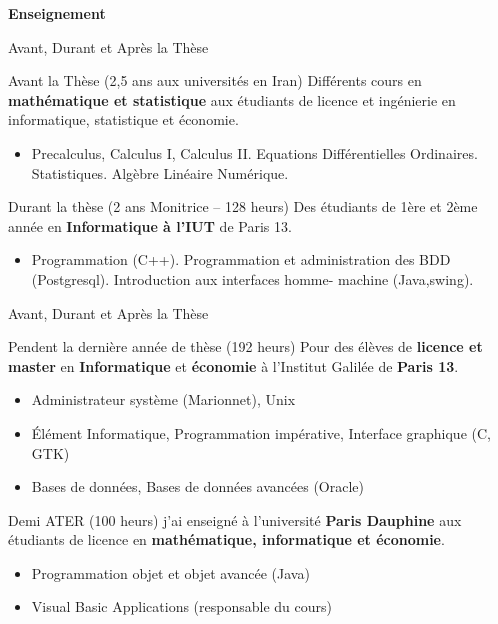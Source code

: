 \documentclass{beamer}
\begin{document}
{{%

\begin{frame}
	\begin{center}
	\textbf{Enseignement}
	\end{center}
\end{frame}
{

\begin{frame}{Avant, Durant et Après la Thèse}
\begin{block}{Avant la Thèse (2,5 ans aux universités en Iran)}
Différents cours en \textbf{mathématique et statistique} aux étudiants de licence et ingénierie en informatique, statistique et économie.
\begin{itemize}
\item Precalculus, Calculus I, Calculus II. Equations Différentielles Ordinaires. Statistiques. Algèbre Linéaire Numérique.
\end{itemize}
\end{block}

\begin{block}{Durant la thèse (2 ans Monitrice -- 128 heurs)}
Des étudiants de 1ère et 2ème année en \textbf{Informatique à l'IUT} de Paris 13.

\begin{itemize}
\item Programmation (C++). Programmation et administration des BDD (Postgresql). Introduction aux interfaces homme- machine (Java,swing).
\end{itemize}
\end{block}

\end{frame}

\begin{frame}{Avant, Durant et Après la Thèse}

\begin{block}{Pendent la dernière année de thèse (192 heurs)}
Pour des élèves de \textbf{licence et master} en \textbf{Informatique} et \textbf{économie} à l'Institut Galilée de \textbf{Paris 13}.
\begin{itemize}
 \item Administrateur système (Marionnet), Unix
 \item Élément Informatique, Programmation impérative, Interface graphique (C, GTK)
 \item Bases de données, Bases de données avancées (Oracle)
\end{itemize}
\end{block}
\begin{block}{Demi ATER (100 heurs)}
j'ai enseigné à l'université \textbf{Paris Dauphine} aux étudiants de licence en \textbf{mathématique, informatique et économie}.
\begin{itemize} 
\item Programmation objet et objet avancée (Java)
\item Visual Basic Applications (responsable du cours)
\end{itemize}


\end{block}
\end{frame}}}}
\end{document}
